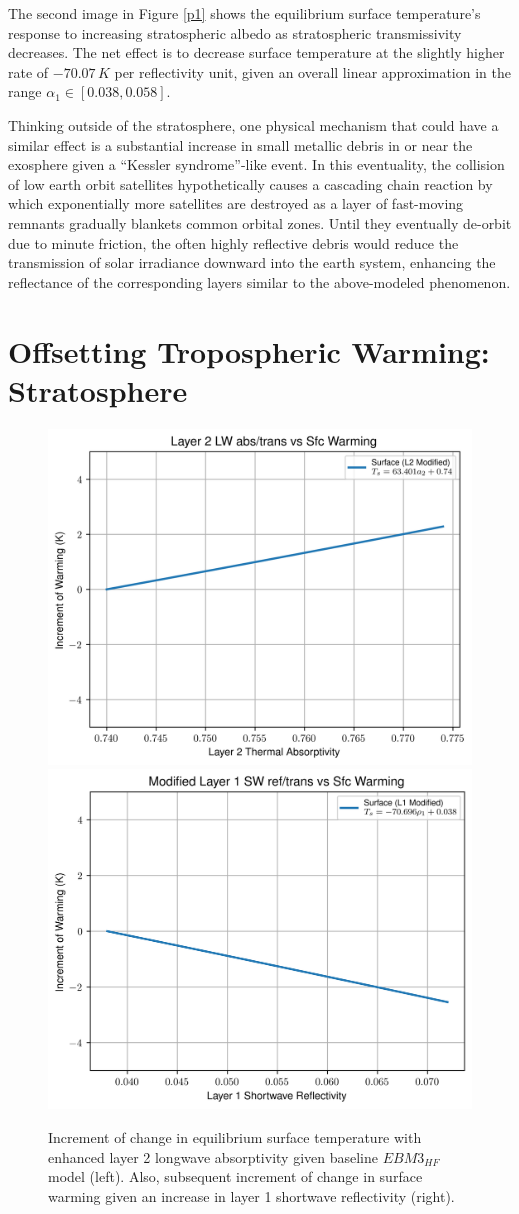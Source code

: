 \documentclass[12pt]{article}
\begin{document}
The second image in Figure \ref{p1} shows the equilibrium surface temperature's response to increasing stratospheric albedo as stratospheric transmissivity decreases. The net effect is to decrease surface temperature at the slightly higher rate of $-70.07\,\si{K}$ per reflectivity unit, given an overall linear approximation in the range $\alpha_1 \in [0.038, 0.058]$.

Thinking outside of the stratosphere, one physical mechanism that could have a similar effect is a substantial increase in small metallic debris in or near the exosphere given a ``Kessler syndrome''-like event. In this eventuality, the collision of low earth orbit satellites hypothetically causes a cascading chain reaction by which exponentially more satellites are destroyed as a layer of fast-moving remnants gradually blankets common orbital zones. Until they eventually de-orbit due to minute friction, the often highly reflective debris would reduce the transmission of solar irradiance downward into the earth system, enhancing the reflectance of the corresponding layers similar to the above-modeled phenomenon.

\section{Offsetting Tropospheric Warming: Stratosphere}

\begin{figure}[h!]\label{p2}
    \centering
    \includegraphics[width=.48\linewidth]{p2a.png}
    \includegraphics[width=.48\linewidth]{p2b.png}
    \caption{Increment of change in equilibrium surface temperature with enhanced layer 2 longwave absorptivity given baseline $EBM3_{HF}$ model (left). Also, subsequent increment of change in surface warming given an increase in layer 1 shortwave reflectivity (right).}
\end{figure}
\end{document}

